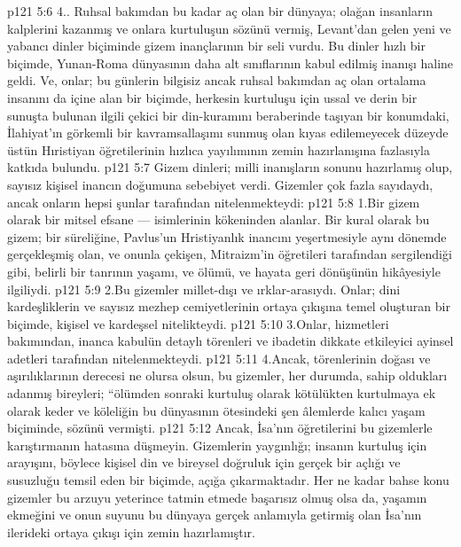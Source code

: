 \vs p121 5:6 4.\bibnobreakspace {}. Ruhsal bakımdan bu kadar aç olan bir dünyaya; olağan insanların kalplerini kazanmış ve onlara  kurtuluşun sözünü vermiş, Levant’dan gelen yeni ve yabancı dinler biçiminde gizem inançlarının bir seli vurdu. Bu dinler hızlı bir biçimde, Yunan\hyp{}Roma dünyasının daha alt sınıflarının kabul edilmiş inanışı haline geldi. Ve, onlar; bu günlerin bilgisiz ancak ruhsal bakımdan aç olan ortalama insanını da içine alan bir biçimde, herkesin kurtuluşu için ussal ve derin bir sunuşta bulunan ilgili çekici bir din\hyp{}kuramını beraberinde taşıyan bir konumdaki, İlahiyat’ın görkemli bir kavramsallaşımı sunmuş olan kıyas edilemeyecek düzeyde üstün Hıristiyan öğretilerinin hızlıca yayılımının zemin hazırlanışına fazlasıyla katkıda bulundu.
\vs p121 5:7 Gizem dinleri; milli inanışların sonunu hazırlamış olup, sayısız kişisel inancın doğumuna sebebiyet verdi. Gizemler çok fazla sayıdaydı, ancak onların hepsi şunlar tarafından nitelenmekteydi:
\vs p121 5:8 1.\bibnobreakspace Bir gizem olarak bir mitsel efsane --- isimlerinin kökeninden alanlar. Bir kural olarak bu gizem; bir süreliğine, Pavlus’un Hristiyanlık inancını yeşertmesiyle aynı dönemde gerçekleşmiş olan, ve onunla çekişen, Mitraizm’in öğretileri tarafından sergilendiği gibi, belirli bir tanrının yaşamı, ve ölümü, ve hayata geri dönüşünün hikâyesiyle ilgiliydi.
\vs p121 5:9 2.\bibnobreakspace Bu gizemler millet\hyp{}dışı ve ırklar\hyp{}arasıydı. Onlar; dini kardeşliklerin ve sayısız mezhep cemiyetlerinin ortaya çıkışına temel oluşturan bir biçimde, kişisel ve kardeşsel nitelikteydi.
\vs p121 5:10 3.\bibnobreakspace Onlar, hizmetleri bakımından, inanca kabulün detaylı törenleri ve ibadetin dikkate etkileyici ayinsel adetleri tarafından nitelenmekteydi.
\vs p121 5:11 4.\bibnobreakspace Ancak, törenlerinin doğası ve aşırılıklarının derecesi ne olursa olsun, bu gizemler, her durumda, sahip oldukları adanmış bireyleri; “ölümden sonraki kurtuluş olarak kötülükten kurtulmaya ek olarak keder ve köleliğin bu dünyasının ötesindeki şen âlemlerde kalıcı yaşam biçiminde,  sözünü vermişti.
\vs p121 5:12 Ancak, İsa’nın öğretilerini bu gizemlerle karıştırmanın hatasına düşmeyin. Gizemlerin yaygınlığı; insanın kurtuluş için arayışını, böylece kişisel din ve bireysel doğruluk için gerçek bir açlığı ve susuzluğu temsil eden bir biçimde, açığa çıkarmaktadır. Her ne kadar bahse konu gizemler bu arzuyu yeterince tatmin etmede başarısız olmuş olsa da, yaşamın ekmeğini ve onun suyunu bu dünyaya gerçek anlamıyla getirmiş olan İsa’nın ilerideki ortaya çıkışı için zemin hazırlamıştır.
